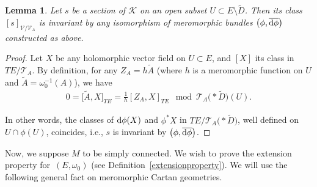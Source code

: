 \documentclass[10pt,a4paper]{amsart}
\numberwithin{equation}{section}
\newtheorem{Lemma}[Theorem]{Lemma}
\begin{document}
\begin{Lemma}\label{killBott} Let $s$ be a section of $\mathcal{K}$ on an open subset $U\subset E\setminus \tilde{D}$. Then its class $[s]_{\mathcal{V}/\mathcal{V}_A}$ is invariant by any isomorphism of meromorphic bundles $\big(\phi,\overline{{\rm d}\phi}\big)$ constructed as above. \end{Lemma}
\begin{proof} Let $X$ be any holomorphic vector field on $U\subset E$, and $[X]$ its class in $TE/\mathcal{T}_A$. By definition, for any $Z_A = h \tilde{A}$ (where $h$ is a meromorphic function on $U$ and $\tilde{A}=\omega_0^{-1}(A)$), we have
\begin{align*}
 0 = \big[\tilde{A},X\big]_{TE} = \frac{1}{h}[Z_A,X]_{TE} \mod \mathcal{T}_A\bigl(* \tilde{D}\bigr)(U).
 \end{align*}

In other words, the classes of ${\rm d}\phi(X)$ and $\phi^* X$ in $TE/\mathcal{T}_A\bigl(* \tilde{D}\bigr)$, well defined on $U\cap \phi(U)$, coincides, i.e., $s$ is invariant by $\big(\phi,\overline{{\rm d}\phi}\big)$. \end{proof}

Now, we suppose $M$ to be simply connected. We wish to prove the extension property for~$(E,\omega_0)$ (see Definition~\ref{extensionproperty}). We will use the following general fact on meromorphic Cartan geometries.
\end{document}
